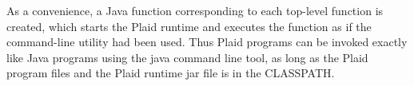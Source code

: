 As a convenience, a Java function corresponding to each top-level
function is created, which starts the Plaid runtime and executes the
function as if the  command-line utility had been used.
Thus Plaid programs can be invoked exactly like Java programs using
the java command line tool, as long as the Plaid program files and the
Plaid runtime jar file is in the CLASSPATH.











